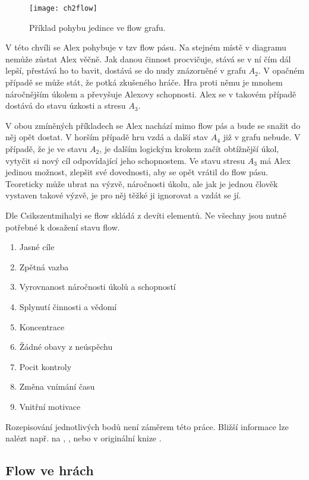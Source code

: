 \begin{figure}
  \centering
  \texttt{[image: ch2flow]}
	\caption{Příklad pohybu jedince ve flow grafu. \cite{OptimalFun} }
	\label{fig:ch2flow}
\end{figure}

V této chvíli se Alex pohybuje v tzv flow pásu. Na stejném místě v diagramu nemůže zůstat Alex věčně. Jak danou činnost procvičuje, stává se v ní čím dál lepší, přestává ho to bavit, dostává se do nudy znázorněné v grafu $A_2$. V opačném případě se může stát, že potká zkušeného hráče. Hra proti němu je mnohem náročnějším úkolem a převyšuje Alexovy schopnosti. Alex se v takovém případě dostává do stavu úzkosti a stresu $A_3$.

V obou zmíněných příkladech se Alex nachází mimo flow pás a bude se snažit do něj opět dostat. V horším případě hru vzdá a další stav $A_4$ již v grafu nebude. V případě, že je ve stavu $A_2$, je dalším logickým krokem začít obtížnější úkol, vytyčit si nový cíl odpovídající jeho schopnostem. Ve stavu stresu $A_3$ má Alex jedinou možnost, zlepšit své dovednosti, aby se opět vrátil do flow pásu. Teoreticky může ubrat na výzvě, náročnosti úkolu, ale jak je jednou člověk vystaven takové výzvě, je pro něj těžké ji ignorovat a vzdát se jí. \cite{OptimalFun}

Dle Csikszentmihalyi se flow skládá z devíti elementů. \cite{FlowEng} Ne všechny jsou nutně potřebné k dosažení stavu flow.

\begin{enumerate}
	\item Jasné cíle
	\item Zpětná vazba
	\item Vyrovnanost náročnosti úkolů a schopností
	\item Splynutí činnosti a vědomí
	\item Koncentrace
	\item Žádné obavy z neúspěchu
	\item Pocit kontroly
	\item Změna vnímání času
	\item Vnitřní motivace
\end{enumerate}

Rozepisování jednotlivých bodů není záměrem této práce. Bližší informace lze nalézt např. na \cite{FlowEng}, \cite{FlowCZ}, nebo v originální knize \cite{OptimalFun}.

\subsection{Flow ve hrách}

